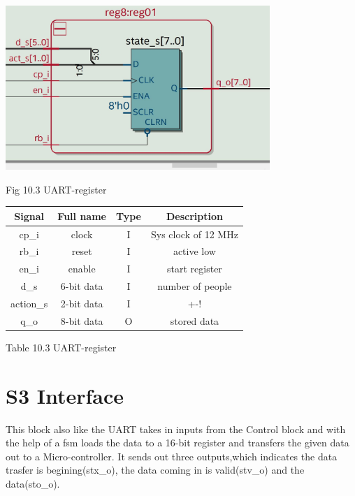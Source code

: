 \documentclass{article}
\begin{document}
\vspace{1cm}
\begin{center}

\includegraphics[width=10cm]{reguat.JPG}
\end{center}
Fig 10.3 UART-register

\vspace{1 cm}
\begin{center}
           \begin{tabular}{|c|c|c|c|}
        \hline 
        Signal  &  Full name & Type & Description \\
        \hline
        \hline
        cp\_i & clock & I & Sys clock of 12 MHz \\
        \hline
        rb\_i & reset & I & active low \\
        \hline
        en\_i & enable & I & start register  \\
        \hline
        d\_s & 6-bit data & I &number of people   \\ 
        \hline
        action\_s &  2-bit data  & I & +-! \\
        \hline 
        q\_o &   8-bit data & O & stored data\\
        \hline 
          \end{tabular}
\end{center}
Table 10.3 UART-register
\newpage
\section{S3 Interface}
This  block also like the UART takes in inputs from the Control block and with the help of a fsm loads the data to a 16-bit register  and transfers the given data out to a Micro-controller. It sends out three outputs,which indicates the data trasfer is begining(stx\_o), the data coming in is valid(stv\_o) and the data(sto\_o).
\end{document}
